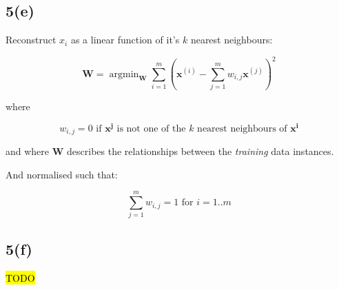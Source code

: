 \documentclass[12pt, a4paper,reqno]{article}
\DeclareMathOperator*{\argmin}{argmin}
\begin{document}
\subsection*{5(e)}

Reconstruct $x_i$ as a linear function of it's $k$ nearest neighbours:

\begin{equation}
\mathbf{W} = \argmin_{\mathbf{W}} \sum_{i=1}^m\left(\mathbf{x}^{(i)} - \sum_{j=1}^m w_{i, j} \mathbf{x}^{(j)}\right)^2
\end{equation}

where

\begin{equation}
w_{i,j} = 0\text{ if $\mathbf{x^j}$ is not one of the $k$ nearest neighbours of $\mathbf{x^i}$}
\end{equation}

and where $\mathbf{W}$ describes the relationships between the \emph{training} data instances.

And normalised such that:

\begin{equation}
\sum_{j=1}^m w_{i, j} = 1\text{ for } i = 1..m
\end{equation}

\subsection*{5(f)}
\hl{TODO}
\end{document}
